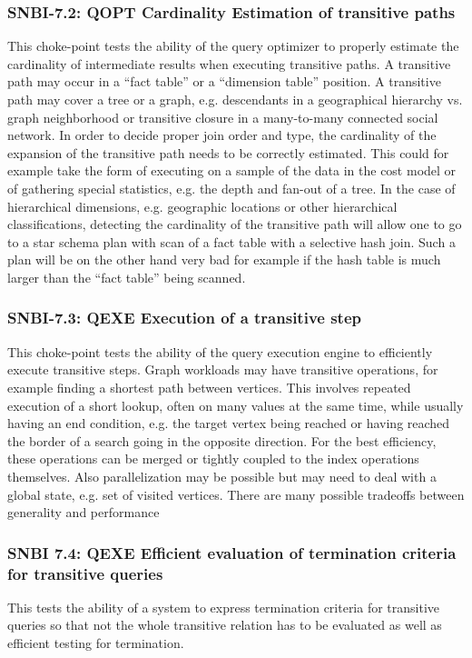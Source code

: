 \subsubsection{SNBI-7.2: QOPT Cardinality Estimation of transitive paths}
\label{choke_point_7.2}
This choke-point tests the ability of the query optimizer to properly estimate the cardinality of intermediate results when executing transitive paths. A transitive path may occur in a “fact table” or a “dimension table” position.
A transitive path may cover a tree or a graph, e.g. descendants in a geographical hierarchy vs. graph neighborhood or transitive closure in a many-to-many connected social network.
In order to decide proper join order and type, the cardinality of the expansion of the transitive path needs to be correctly estimated.
This could for example take the form of executing on a sample of the data in the cost model or of gathering special statistics, e.g. the depth and fan-out of a tree. In the case of hierarchical dimensions,
e.g. geographic locations or other hierarchical classifications, detecting the cardinality of the transitive path will allow one to go to a star schema plan with scan of a fact table with a selective hash join.
Such a plan will be on the other hand very bad for example if the hash table is much larger than the “fact table” being scanned.

\subsubsection{SNBI-7.3: QEXE Execution of a transitive step}
\label{choke_point_7.3}
This choke-point tests the ability of the query execution engine to efficiently execute transitive steps. Graph workloads may have transitive operations, for example finding a shortest path between vertices.
This involves repeated execution of a short lookup, often on many values at the same time, while usually having an end condition, e.g. the target vertex being reached or having reached the border of a search going in the opposite direction.
For the best efficiency, these operations can be merged or tightly coupled to the index operations themselves. Also parallelization may be possible but may need to deal with a global state, e.g. set of visited vertices.
There are many possible tradeoffs between generality and performance

\subsubsection{SNBI 7.4: QEXE Efficient evaluation of termination criteria for transitive queries}
\label{choke_point_7.4}
This tests the ability of a system to express termination criteria for transitive queries so that not the whole transitive relation has to be evaluated as well as efficient testing for termination.

